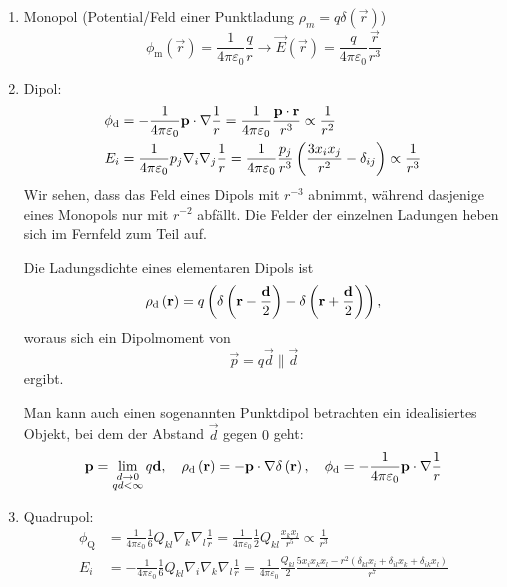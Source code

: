 \begin{enumerate}
	\item Monopol (Potential/Feld einer Punktladung $\rho _{m}=q\delta \left(\vec {r}\right)$)
		\begin{equation*}
			\phi _{\mathrm{m}}\left(\vec {r}\right)=\frac{1}{4\pi \varepsilon _{0}}\frac{q}{r}\rightarrow \vec {E}(\vec r)=\frac{q}{4\pi \varepsilon _{0}}\frac{\vec {r}}{r^{3}}
		\end{equation*}
	\item Dipol:
		\begin{align*}
				\phi _{\text{d} }&=-\frac{1}{4\pi \varepsilon _{0}}\mathbf{p}\cdot \nabla \frac{1}{r}=\frac{1}{4\pi \varepsilon _{0}}\frac{\mathbf{p}\cdot \mathbf{r}}{r^{3}}\propto \frac{1}{r^{2}} \\
				E_{i}&=\frac{1}{4\pi \varepsilon _{0}}p_{j}\nabla _{i}\nabla _{j}\frac{1}{r}=\frac{1}{4\pi \varepsilon _{0}}\frac{p_{j}}{r^{3}}\left(\frac{3x_{i}x_{j}}{r^{2}}-\delta _{ij}\right)\propto \frac{1}{r^{3}}
		\end{align*}
		Wir sehen, dass das Feld eines Dipols mit $r^{-3}$ abnimmt, während dasjenige eines Monopols nur mit $r^{-2}$ abfällt. Die Felder der einzelnen Ladungen heben sich im Fernfeld zum Teil auf.

		Die Ladungsdichte eines elementaren Dipols ist
		\begin{equation*}
			\rho _{\text{d} }\left(\mathbf{r}\right)=q\left(\delta \left(\mathbf{r}-\frac{\mathbf{d}}{2}\right)-\delta \left(\mathbf{r}+\frac{\mathbf{d}}{2}\right)\right),
		\end{equation*}
		woraus sich ein Dipolmoment von
		\begin{equation*}
			\vec {p}=q\vec {d}\parallel \vec {d}
		\end{equation*}
		ergibt. 

		Man kann auch einen sogenannten Punktdipol betrachten \textendash{} ein idealisiertes Objekt, bei dem der Abstand $\vec {d}$ gegen $0$ geht:
		\begin{equation*}
			\mathbf{p}=\lim _{\substack{
					d\rightarrow 0 \\
					qd<\infty}} q\mathbf{d},\quad \rho _{\text{d} }\left(\mathbf{r}\right)=-\mathbf{p}\cdot \nabla \delta \left(\mathbf{r}\right), \quad\phi _{\text{d} }=-\frac{1}{4\pi \varepsilon _{0}}\mathbf{p}\cdot \nabla \frac{1}{r}
		\end{equation*}
	\item Quadrupol:
		\begin{align*}
				\phi _{\mathrm{Q}}&=\frac{1}{4\pi \varepsilon _{0}}\frac{1}{6}Q_{kl}\nabla _{k}\nabla _{l}\frac{1}{r}=\frac{1}{4\pi \varepsilon _{0}}\frac{1}{2}Q_{kl}\frac{x_{k}x_{l}}{r^{5}}\propto \frac{1}{r^{3}} \\
				E_{i}&=-\frac{1}{4\pi \varepsilon _{0}}\frac{1}{6}Q_{kl}\nabla _{i}\nabla _{k}\nabla _{l}\frac{1}{r}=\frac{1}{4\pi \varepsilon _{0}}\frac{Q_{kl}}{2}\frac{5x_{i}x_{k}x_{l}-r^{2}\left(\delta _{kl}x_{i}+\delta _{il}x_{k}+\delta _{ik}x_{l}\right)}{r^{7}}
		\end{align*}



\end{enumerate}
